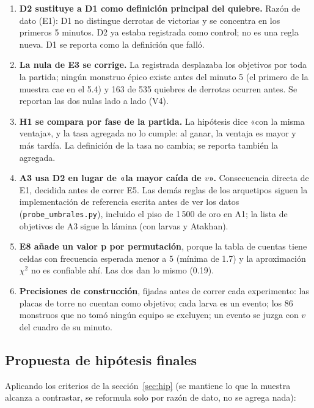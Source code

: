 \documentclass[11pt,letterpaper]{article}
\begin{document}
\begin{enumerate}[leftmargin=1.6em,itemsep=.3em]
  \item \textbf{D2 sustituye a D1 como definición principal del quiebre.} Razón de
        dato (E1): D1 no distingue derrotas de victorias y se concentra en los primeros
        5 minutos. D2 ya estaba registrada como control; no es una regla nueva. D1 se
        reporta como la definición que falló.
  \item \textbf{La nula de E3 se corrige.} La registrada desplazaba los objetivos por
        toda la partida; ningún monstruo épico existe antes del minuto 5 (el primero de
        la muestra cae en el 5.4) y 163 de 535 quiebres de derrotas ocurren antes. Se
        reportan las dos nulas lado a lado (V4).
  \item \textbf{H1 se compara por fase de la partida.} La hipótesis dice «con la misma
        ventaja», y la tasa agregada no lo cumple: al ganar, la ventaja es mayor y más
        tardía. La definición de la tasa no cambia; se reporta también la agregada.
  \item \textbf{A3 usa D2 en lugar de «la mayor caída de \(v\)».} Consecuencia directa
        de E1, decidida antes de correr E5. Las demás reglas de los arquetipos siguen
        la implementación de referencia escrita antes de ver los datos
        (\texttt{probe\_umbrales.py}), incluido el piso de 1\,500 de oro en A1; la
        lista de objetivos de A3 sigue la lámina (con larvas y Atakhan).
  \item \textbf{E8 añade un valor p por permutación}, porque la tabla de cuentas tiene
        celdas con frecuencia esperada menor a 5 (mínima de 1.7) y la aproximación
        \(\chi^2\) no es confiable ahí. Las dos dan lo mismo (0.19).
  \item \textbf{Precisiones de construcción}, fijadas antes de correr cada experimento:
        las placas de torre no cuentan como objetivo; cada larva es un evento; los 86
        monstruos que no tomó ningún equipo se excluyen; un evento se juzga con \(v\) del
        cuadro de su minuto.
\end{enumerate}

\subsection{Propuesta de hipótesis finales}
\label{sec:prelim}

Aplicando los criterios de la sección~\ref{sec:hip} (se mantiene lo que la muestra
alcanza a contrastar, se reformula solo por razón de dato, no se agrega nada):
\end{document}

